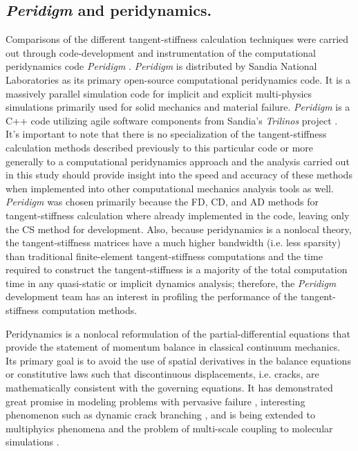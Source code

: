 \documentclass[preprint,12pt]{elsarticle}
\begin{document}
\subsection{\emph{Peridigm} and peridynamics.}
\label{subsec:PaP}
%
Comparisons of the different tangent-stiffness calculation techniques were
carried out through code-development and instrumentation of the
computational peridynamics code \emph{Peridigm} \cite{peridigm}.
\emph{Peridigm} is distributed by Sandia National Laboratories as its primary
open-source computational peridynamics code. It is a massively parallel
simulation code for implicit and explicit multi-physics simulations primarily
used for solid mechanics and material failure. \emph{Peridigm} is a C++ code
utilizing agile software components from Sandia's  \emph{Trilinos} project
\cite{trilinos}. It's important to note that there is no specialization of the
tangent-stiffness calculation methods described previously to this particular
code or more generally to a computational peridynamics approach and the
analysis carried out in this study should provide insight into the speed and
accuracy of these methods when implemented into other computational mechanics
analysis tools as well.  \emph{Peridigm} was chosen primarily because the FD,
CD, and AD methods for tangent-stiffness calculation where already implemented
in the code, leaving only the CS method for development. Also, because
peridynamics is a nonlocal theory, the tangent-stiffness matrices have a much
higher bandwidth (i.e. less sparsity) than traditional finite-element
tangent-stiffness computations and the time required to construct the
tangent-stiffness is a majority of the total computation time in any
quasi-static or implicit dynamics analysis; therefore, the \emph{Peridigm}
development team has an interest in profiling the performance of the
tangent-stiffness computation methods.

Peridynamics \cite{silling2000ret,silling:psa,silling2010peridynamic}
is a nonlocal reformulation of the partial-differential equations that provide
the statement of momentum balance in classical continuum mechanics. Its primary
goal is to avoid the use of spatial derivatives in the balance equations or
constitutive laws such that discontinuous displacements, i.e. cracks, are
mathematically consistent with the governing equations. It has demonstrated
great promise in modeling problems with pervasive failure
\cite{littlewood2010}, interesting phenomenon such as dynamic crack branching
\cite{ha2010sod}, and is being extended to multiphyics phenomena
\cite{bobaru2011peridynamic,katiyar2013} and the problem of multi-scale
coupling to molecular simulations \cite{seleson2009peridynamics,seleson2014atom}. 
\end{document}
